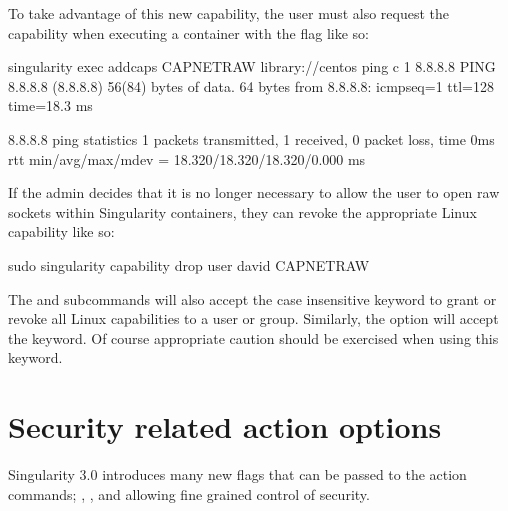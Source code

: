 \documentclass[letterpaper,10pt,english]{sphinxmanual}
\begin{document}
To take advantage of this new capability, the user  must also request
the capability when executing a container with the  flag like so:

%
\begin{sphinxVerbatim}[commandchars=\\\{\}]
\PYGZdl{} singularity exec \PYGZhy{}\PYGZhy{}add\PYGZhy{}caps CAP\PYGZus{}NET\PYGZus{}RAW library://centos ping \PYGZhy{}c 1 8.8.8.8
PING 8.8.8.8 (8.8.8.8) 56(84) bytes of data.
64 bytes from 8.8.8.8: icmp\PYGZus{}seq=1 ttl=128 time=18.3 ms

\PYGZhy{}\PYGZhy{}\PYGZhy{} 8.8.8.8 ping statistics \PYGZhy{}\PYGZhy{}\PYGZhy{}
1 packets transmitted, 1 received, 0\PYGZpc{} packet loss, time 0ms
rtt min/avg/max/mdev = 18.320/18.320/18.320/0.000 ms
\end{sphinxVerbatim}

If the admin decides that it is no longer necessary to allow the user 
to open raw sockets within Singularity containers, they can revoke the
appropriate Linux capability like so:

%
\begin{sphinxVerbatim}[commandchars=\\\{\}]
\PYGZdl{} sudo singularity capability drop \PYGZhy{}\PYGZhy{}user david CAP\PYGZus{}NET\PYGZus{}RAW
\end{sphinxVerbatim}

The  and  subcommands will also accept the case
insensitive keyword  to grant or revoke all Linux capabilities to a user
or group.  Similarly, the  option will accept the  keyword.
Of course appropriate caution should be exercised when using this keyword.


\section{Security related action options}
\label{\detokenize{security_options:security-related-action-options}}
Singularity 3.0 introduces many new flags that can be passed to the action
commands; , , and  allowing fine grained control of
security.
\end{document}
